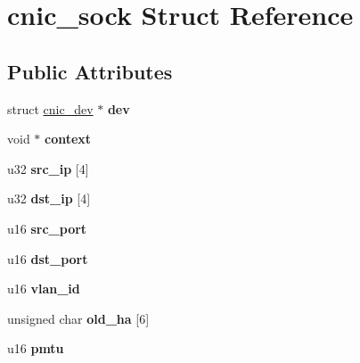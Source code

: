 \hypertarget{structcnic__sock}{
\section{cnic\_\-sock Struct Reference}
\label{structcnic__sock}
}
\subsection*{Public Attributes}
\begin{DoxyCompactItemize}
\item 
\hypertarget{structcnic__sock_a2feecba522383efe996fc2ef9b1ad19e}{
struct \hyperlink{structcnic__dev}{cnic\_\-dev} $\ast$ {\bfseries dev}}
\label{structcnic__sock_a2feecba522383efe996fc2ef9b1ad19e}

\item 
\hypertarget{structcnic__sock_a2eb4c1d1c1172cf35673db4b1fdc53e9}{
void $\ast$ {\bfseries context}}
\label{structcnic__sock_a2eb4c1d1c1172cf35673db4b1fdc53e9}

\item 
\hypertarget{structcnic__sock_a309dba29b1e4232eaab80c1a4afcae97}{
u32 {\bfseries src\_\-ip} \mbox{[}4\mbox{]}}
\label{structcnic__sock_a309dba29b1e4232eaab80c1a4afcae97}

\item 
\hypertarget{structcnic__sock_ab0ea07f6251449b370ebab5c6460d4cb}{
u32 {\bfseries dst\_\-ip} \mbox{[}4\mbox{]}}
\label{structcnic__sock_ab0ea07f6251449b370ebab5c6460d4cb}

\item 
\hypertarget{structcnic__sock_a41584576e30044bceba60edb8b2ea82c}{
u16 {\bfseries src\_\-port}}
\label{structcnic__sock_a41584576e30044bceba60edb8b2ea82c}

\item 
\hypertarget{structcnic__sock_afcbddc8e66ef83f2f785063403970b75}{
u16 {\bfseries dst\_\-port}}
\label{structcnic__sock_afcbddc8e66ef83f2f785063403970b75}

\item 
\hypertarget{structcnic__sock_a60668870fddd80ebf9c86663ee2ff377}{
u16 {\bfseries vlan\_\-id}}
\label{structcnic__sock_a60668870fddd80ebf9c86663ee2ff377}

\item 
\hypertarget{structcnic__sock_a03377be374ff11f6a75cdf68ecefae18}{
unsigned char {\bfseries old\_\-ha} \mbox{[}6\mbox{]}}
\label{structcnic__sock_a03377be374ff11f6a75cdf68ecefae18}

\item 
\hypertarget{structcnic__sock_a6647b4fd51d4c2cd487f0bdd93b5e6e7}{
u16 {\bfseries pmtu}}
\label{structcnic__sock_a6647b4fd51d4c2cd487f0bdd93b5e6e7}


\end{DoxyCompactItemize}
